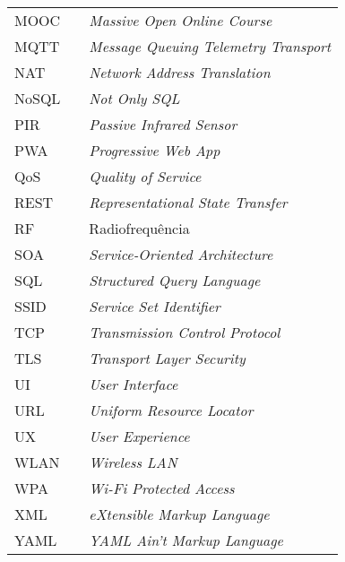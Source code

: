 \begin{table}[H]
\begin{tabular}{lll}
MOOC  &  & \textit{Massive Open Online Course}                       \\
MQTT  &  & \textit{Message Queuing Telemetry Transport}              \\
NAT   &  & \textit{Network Address Translation}                      \\
NoSQL &  & \textit{Not Only SQL}                                     \\
PIR   &  & \textit{Passive Infrared Sensor}                          \\
PWA   &  & \textit{Progressive Web App}                              \\
QoS   &  & \textit{Quality of Service}                               \\
REST  &  & \textit{Representational State Transfer}                  \\
RF    &  & Radiofrequência                                           \\
SOA   &  & \textit{Service-Oriented Architecture}                    \\
SQL   &  & \textit{Structured Query Language}                        \\
SSID  &  & \textit{Service Set Identifier}                           \\
TCP   &  & \textit{Transmission Control Protocol}                    \\
TLS   &  & \textit{Transport Layer Security}                         \\
UI    &  & \textit{User Interface}                                   \\
URL   &  & \textit{Uniform Resource Locator}                         \\
UX    &  & \textit{User Experience}                                  \\
WLAN  &  & \textit{Wireless LAN}                                     \\
WPA   &  & \textit{Wi-Fi Protected Access}                           \\
XML   &  & \textit{eXtensible Markup Language}                       \\
YAML  &  & \textit{YAML Ain't Markup Language}
\end{tabular}
\end{table}
